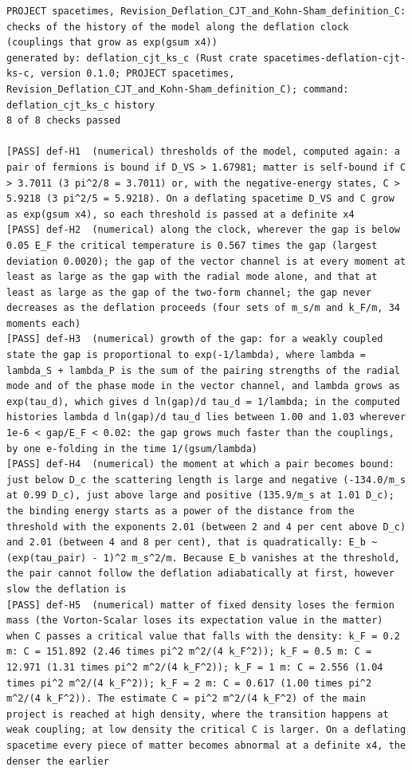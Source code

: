 \documentclass[
  10pt,
]{article}
\begin{document}
\begin{verbatim}
PROJECT spacetimes, Revision_Deflation_CJT_and_Kohn-Sham_definition_C: checks of the history of the model along the deflation clock (couplings that grow as exp(gsum x4))
generated by: deflation_cjt_ks_c (Rust crate spacetimes-deflation-cjt-ks-c, version 0.1.0; PROJECT spacetimes, Revision_Deflation_CJT_and_Kohn-Sham_definition_C); command: deflation_cjt_ks_c history
8 of 8 checks passed

[PASS] def-H1  (numerical) thresholds of the model, computed again: a pair of fermions is bound if D_VS > 1.67981; matter is self-bound if C > 3.7011 (3 pi^2/8 = 3.7011) or, with the negative-energy states, C > 5.9218 (3 pi^2/5 = 5.9218). On a deflating spacetime D_VS and C grow as exp(gsum x4), so each threshold is passed at a definite x4
[PASS] def-H2  (numerical) along the clock, wherever the gap is below 0.05 E_F the critical temperature is 0.567 times the gap (largest deviation 0.0020); the gap of the vector channel is at every moment at least as large as the gap with the radial mode alone, and that at least as large as the gap of the two-form channel; the gap never decreases as the deflation proceeds (four sets of m_s/m and k_F/m, 34 moments each)
[PASS] def-H3  (numerical) growth of the gap: for a weakly coupled state the gap is proportional to exp(-1/lambda), where lambda = lambda_S + lambda_P is the sum of the pairing strengths of the radial mode and of the phase mode in the vector channel, and lambda grows as exp(tau_d), which gives d ln(gap)/d tau_d = 1/lambda; in the computed histories lambda d ln(gap)/d tau_d lies between 1.00 and 1.03 wherever 1e-6 < gap/E_F < 0.02: the gap grows much faster than the couplings, by one e-folding in the time 1/(gsum/lambda)
[PASS] def-H4  (numerical) the moment at which a pair becomes bound: just below D_c the scattering length is large and negative (-134.0/m_s at 0.99 D_c), just above large and positive (135.9/m_s at 1.01 D_c); the binding energy starts as a power of the distance from the threshold with the exponents 2.01 (between 2 and 4 per cent above D_c) and 2.01 (between 4 and 8 per cent), that is quadratically: E_b ~ (exp(tau_pair) - 1)^2 m_s^2/m. Because E_b vanishes at the threshold, the pair cannot follow the deflation adiabatically at first, however slow the deflation is
[PASS] def-H5  (numerical) matter of fixed density loses the fermion mass (the Vorton-Scalar loses its expectation value in the matter) when C passes a critical value that falls with the density: k_F = 0.2 m: C = 151.892 (2.46 times pi^2 m^2/(4 k_F^2)); k_F = 0.5 m: C = 12.971 (1.31 times pi^2 m^2/(4 k_F^2)); k_F = 1 m: C = 2.556 (1.04 times pi^2 m^2/(4 k_F^2)); k_F = 2 m: C = 0.617 (1.00 times pi^2 m^2/(4 k_F^2)). The estimate C = pi^2 m^2/(4 k_F^2) of the main project is reached at high density, where the transition happens at weak coupling; at low density the critical C is larger. On a deflating spacetime every piece of matter becomes abnormal at a definite x4, the denser the earlier

\end{verbatim}
\end{document}
